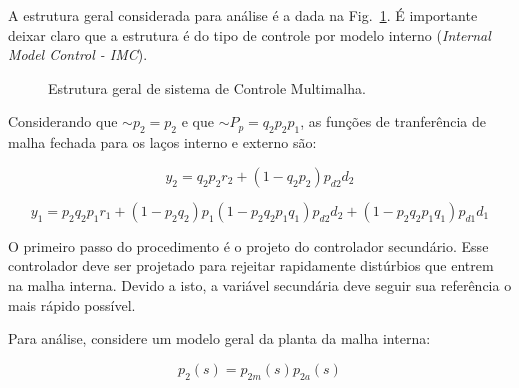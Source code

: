     A estrutura geral considerada para análise é a dada na
    Fig.~\ref{fig:multiloop_lee}. É importante deixar claro que a estrutura é
    do tipo de controle por modelo interno (\textit{Internal Model Control - IMC}).

    \begin{figure}[htb]
        \renewcommand\figurename{Fig.}
        \caption{Estrutura geral de sistema de Controle Multimalha.}
        \label{fig:multiloop_lee}
    \end{figure}

    Considerando que $\sim$$p_2 = p_2$ e que $\sim$$P_p = q_2 p_2 p_1$, as funções de
    tranferência de malha fechada para os laços interno e externo são:

    \begin{equation}
        y_2 = q_2 p_2 r_2 + \left( 1- q_2 p_2 \right) p_{d2} d_2
    \end{equation}

    \begin{equation}
        y_1 = p_2 q_2 p_1 r_1 + \left( 1 - p_2 q_2 \right) p_1 \left(
            1 - p_2 q_2 p_1 q_1 \right) p_{d2} d_2 + \left( 1 - p_2 q_2 p_1 q_1
            \right) p_{d1} d_1
    \end{equation}

    O primeiro passo do procedimento é o projeto do controlador secundário. Esse
    controlador deve ser projetado para rejeitar rapidamente distúrbios que entrem
    na malha interna. Devido a isto, a variável secundária deve seguir sua referência
    o mais rápido possível.

    Para análise, considere um modelo geral da planta da malha interna:

    \begin{equation}
        p_2(s) = p_{2m}(s) p_{2a}(s)
    \end{equation}

